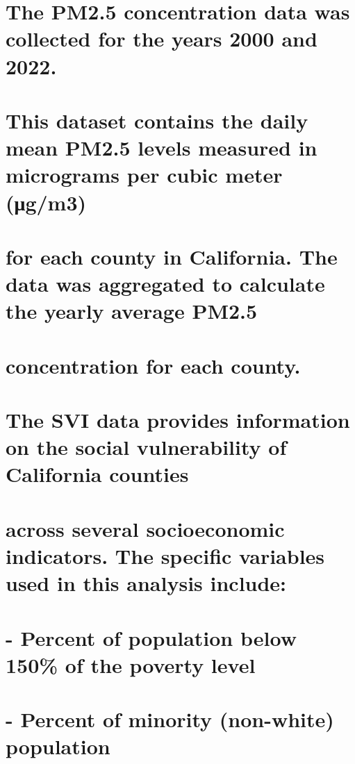 \documentclass[
]{article}
\begin{document}
\section{The PM2.5 concentration data was collected for the years 2000
and
2022.}\label{the-pm2.5-concentration-data-was-collected-for-the-years-2000-and-2022.}

\section{This dataset contains the daily mean PM2.5 levels measured in
micrograms per cubic meter
(μg/m3)}\label{this-dataset-contains-the-daily-mean-pm2.5-levels-measured-in-micrograms-per-cubic-meter-ux3bcgm3}

\section{for each county in California. The data was aggregated to
calculate the yearly average
PM2.5}\label{for-each-county-in-california.-the-data-was-aggregated-to-calculate-the-yearly-average-pm2.5}

\section{concentration for each
county.}\label{concentration-for-each-county.}

\section{The SVI data provides information on the social vulnerability
of California
counties}\label{the-svi-data-provides-information-on-the-social-vulnerability-of-california-counties}

\section{across several socioeconomic indicators. The specific variables
used in this analysis
include:}\label{across-several-socioeconomic-indicators.-the-specific-variables-used-in-this-analysis-include}

\section{- Percent of population below 150\% of the poverty
level}\label{percent-of-population-below-150-of-the-poverty-level}

\section{- Percent of minority (non-white)
population}\label{percent-of-minority-non-white-population}
\end{document}
